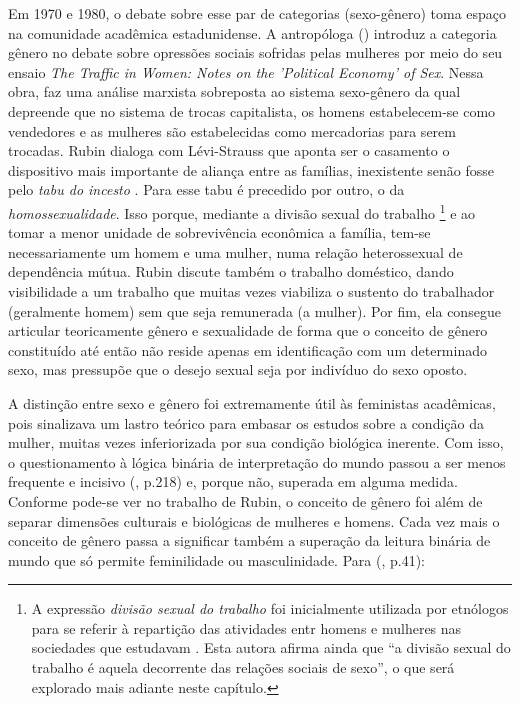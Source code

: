 Em 1970 e 1980, o debate sobre esse par de categorias (sexo-gênero) toma espaço na comunidade acadêmica estadunidense. A antropóloga  (\citeyear{RUBIN1975})  introduz a categoria gênero no debate sobre opressões sociais sofridas pelas mulheres por meio do seu ensaio \emph{The Traffic in Women: Notes on the 'Political Economy' of Sex}. Nessa obra,  faz uma análise marxista sobreposta ao sistema sexo-gênero da qual depreende que no sistema de trocas capitalista, os homens estabelecem-se como vendedores e as mulheres são estabelecidas como mercadorias para serem trocadas.
Rubin dialoga com Lévi-Strauss que aponta ser o casamento o dispositivo mais importante de aliança entre as famílias, inexistente senão fosse pelo \emph{tabu do incesto} \cite{STRAUSS2010}. Para  esse tabu é precedido por outro, o da \emph{homossexualidade}. Isso porque, mediante a divisão sexual do trabalho
\footnote{A expressão \emph{divisão sexual do trabalho} foi inicialmente utilizada por etnólogos para se referir à repartição das atividades entr homens e mulheres nas sociedades que estudavam \cite{KERGOAT2004}. Esta autora afirma ainda que ``a divisão sexual do trabalho é aquela decorrente das relações sociais de sexo'', o que será explorado mais adiante neste capítulo.} e ao tomar a menor unidade de sobrevivência econômica a família, tem-se necessariamente um homem e uma mulher, numa relação heterossexual de dependência mútua. Rubin discute também o trabalho doméstico, dando visibilidade a um trabalho que muitas vezes viabiliza o sustento do trabalhador (geralmente homem) sem que seja remunerada (a mulher). Por fim, ela consegue articular teoricamente gênero e sexualidade de forma que o conceito de gênero constituído até então não reside apenas em identificação com um determinado sexo, mas pressupõe que o desejo sexual seja por indivíduo do sexo oposto. 

A distinção entre sexo e gênero foi extremamente útil às feministas acadêmicas, pois sinalizava um lastro teórico para embasar os estudos sobre a condição da mulher, muitas vezes inferiorizada por sua condição biológica inerente. Com isso, o questionamento à lógica binária de interpretação do mundo passou a ser menos frequente e incisivo  (\citeyear{HARAWAY2004}, p.218) e, porque não, superada em alguma medida. Conforme pode-se ver no trabalho de Rubin, o conceito de gênero foi além de separar dimensões culturais e biológicas de mulheres e homens. Cada vez mais o conceito de gênero passa a significar também a superação da leitura binária de mundo que só permite feminilidade ou masculinidade. Para  (\citeyear{HEILBORN1992}, p.41):


